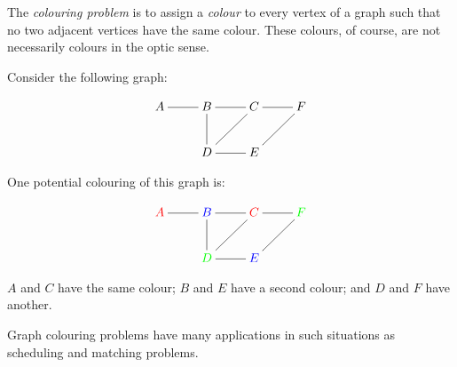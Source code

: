 \documentclass{article}
\begin{document}
The \emph{colouring problem} is to assign a \emph{colour} to every vertex of a graph such that no two adjacent vertices have the same colour.  These colours, of course, are not necessarily colours in the optic sense.

Consider the following graph:

$$\xymatrix{
A \ar@{-}[r] & B \ar@{-}[r] \ar@{-}[d] & C \ar@{-}[r] \ar@{-}[dl] & F \ar@{-}[dl] \\
& D \ar@{-}[r] & E & }$$

One potential colouring of this graph is:

$$\xymatrix{
{\color{red}A} \ar@{-}[r] & {\color{blue}B} \ar@{-}[r] \ar@{-}[d] & {\color{red}C} \ar@{-}[r] \ar@{-}[dl] & {\color{green}F} \ar@{-}[dl] \\
& {\color{green}D} \ar@{-}[r] & {\color{blue}E} & }$$

$A$ and $C$ have the same colour; $B$ and $E$ have a second colour; and $D$ and $F$ have another.

Graph colouring problems have many applications in such situations as scheduling and matching problems.
\end{document}
